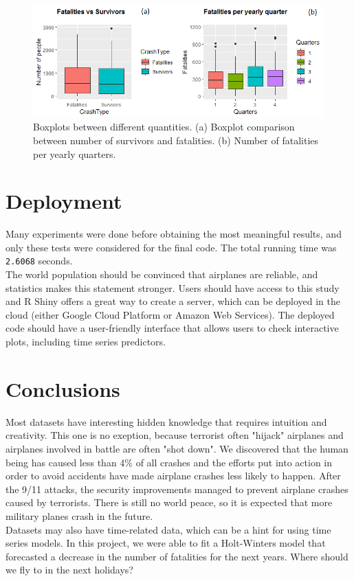 \documentclass[12pt]{article}
\begin{document}
\begin{figure}[H]
	\centering
	\includegraphics[width=1\linewidth]{boxPlots}
	\caption{Boxplots between different quantities. (a) Boxplot comparison between number of survivors and fatalities. (b) Number of fatalities per yearly quarters.}
	\label{fig:equalityPlot}
\end{figure}

\section{Deployment}

Many experiments were done before obtaining the most meaningful results, and only these tests were considered for the final code. The total running time was \texttt{2.6068} seconds.\\

The world population should be convinced that airplanes are reliable, and statistics makes this statement stronger. Users should have access to this study and R Shiny offers a great way to create a server, which can be deployed in the cloud (either Google Cloud Platform or Amazon Web Services). The deployed code should have a user-friendly interface that allows users to check interactive plots, including time series predictors. 

\section*{Conclusions}

Most datasets have interesting hidden knowledge that requires intuition and creativity. This one is no exeption, because terrorist often "hijack" airplanes and airplanes involved in battle are often "shot down". We discovered that the human being has caused less than 4\% of all crashes and the efforts put into action in order to avoid accidents have made airplane crashes less likely to happen. After the 9/11 attacks, the security improvements managed to prevent airplane crashes caused by terrorists. There is still no world peace, so it is expected that more military planes crash in the future.\\

Datasets may also have time-related data, which can be a hint for using time series models. In this project, we were able to fit a Holt-Winters model that forecasted a decrease in the number of fatalities for the next years. Where should we fly to in the next holidays?



\end{document}
